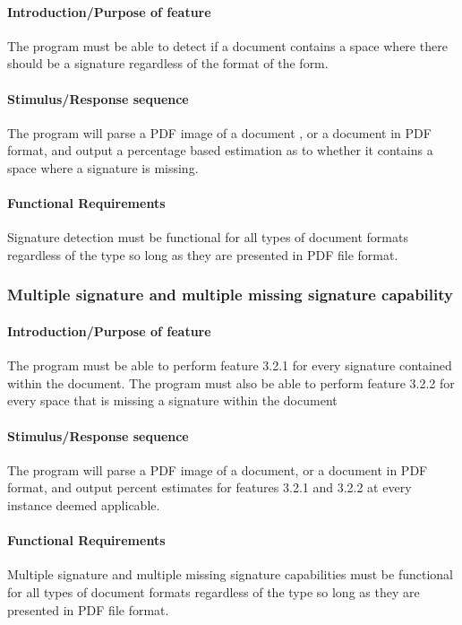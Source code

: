 \documentclass[onecolumn, draftclsnofoot,10pt, compsoc]{IEEEtran}
\begin{document}
\hfill\begin{minipage}{\dimexpr\textwidth-1cm}
\paragraph{Introduction/Purpose of feature}
The program must be able to detect if a document contains a space where there should be a signature regardless of the format of the form.
\paragraph{Stimulus/Response sequence}
The program will parse a PDF image of a document , or a document in PDF format, and output a percentage based estimation as to whether it contains a space where a signature is missing.
\paragraph{Functional Requirements}
Signature detection must be functional for all types of document formats regardless of the type so long as they are presented in PDF file format. 
\end{minipage}
\vspace{.75cm}

\subsubsection{Multiple signature and multiple missing signature capability}\vspace{.5cm}

\hfill\begin{minipage}{\dimexpr\textwidth-2cm}
\paragraph{Introduction/Purpose of feature}
The program must be able to perform feature 3.2.1 for every signature contained within the document. The program must also be able to perform feature 3.2.2 for every space that is missing a signature within the document
\paragraph{Stimulus/Response sequence}
The program will parse a PDF image of a document, or a document in PDF format, and output percent estimates for features 3.2.1 and 3.2.2 at every instance deemed applicable. 
\paragraph{Functional Requirements}
Multiple signature and multiple missing signature capabilities must be functional for all types of document formats regardless of the type so long as they are presented in PDF file format.
\end{minipage}
\end{document}
